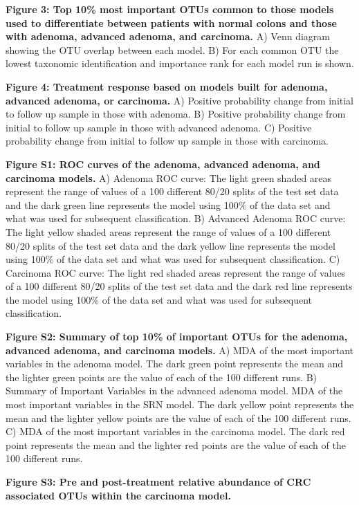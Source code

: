 \documentclass[12pt,]{article}
\begin{document}
\textbf{Figure 3: Top 10\% most important OTUs common to those models
used to differentiate between patients with normal colons and those with
adenoma, advanced adenoma, and carcinoma.} A) Venn diagram showing the
OTU overlap between each model. B) For each common OTU the lowest
taxonomic identification and importance rank for each model run is
shown.

\textbf{Figure 4: Treatment response based on models built for adenoma,
advanced adenoma, or carcinoma.} A) Positive probability change from
initial to follow up sample in those with adenoma. B) Positive
probability change from initial to follow up sample in those with
advanced adenoma. C) Positive probability change from initial to follow
up sample in those with carcinoma.

\newpage

\textbf{Figure S1: ROC curves of the adenoma, advanced adenoma, and
carcinoma models.} A) Adenoma ROC curve: The light green shaded areas
represent the range of values of a 100 different 80/20 splits of the
test set data and the dark green line represents the model using 100\%
of the data set and what was used for subsequent classification. B)
Advanced Adenoma ROC curve: The light yellow shaded areas represent the
range of values of a 100 different 80/20 splits of the test set data and
the dark yellow line represents the model using 100\% of the data set
and what was used for subsequent classification. C) Carcinoma ROC curve:
The light red shaded areas represent the range of values of a 100
different 80/20 splits of the test set data and the dark red line
represents the model using 100\% of the data set and what was used for
subsequent classification.

\textbf{Figure S2: Summary of top 10\% of important OTUs for the
adenoma, advanced adenoma, and carcinoma models.} A) MDA of the most
important variables in the adenoma model. The dark green point
represents the mean and the lighter green points are the value of each
of the 100 different runs. B) Summary of Important Variables in the
advanced adenoma model. MDA of the most important variables in the SRN
model. The dark yellow point represents the mean and the lighter yellow
points are the value of each of the 100 different runs. C) MDA of the
most important variables in the carcinoma model. The dark red point
represents the mean and the lighter red points are the value of each of
the 100 different runs.

\textbf{Figure S3: Pre and post-treatment relative abundance of CRC
associated OTUs within the carcinoma model.}

\newpage
\end{document}
